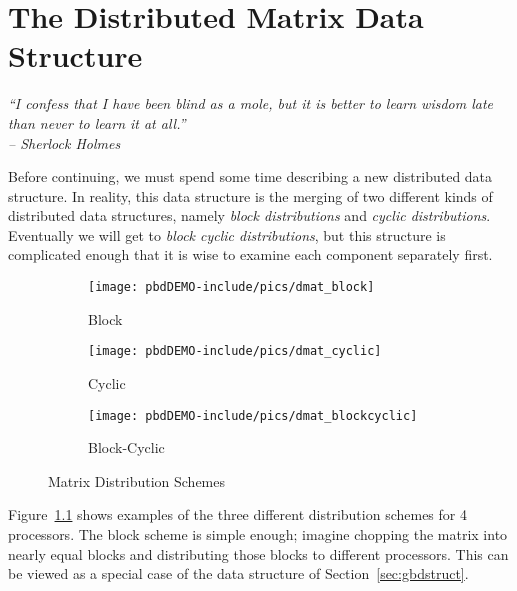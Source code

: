 \chapter{The Distributed Matrix Data Structure}
\label{chap:dmat}


{\it
``I confess that I have been blind as a mole,
but it is better to learn wisdom late than never to learn it at all.'' \\
\--- Sherlock Holmes
}
\vspace{0.5cm}


Before continuing, we must spend some time describing a new distributed data 
structure.  In reality, this data structure is the merging of two different 
kinds of distributed data structures, namely \emph{block distributions} and 
\emph{cyclic distributions}.  Eventually we will get to \emph{block cyclic 
distributions}, but this structure is complicated enough that it is wise to 
examine each component separately first.

\begin{figure}[ht]
        \centering
        \begin{subfigure}[b]{0.3\textwidth}
                \centering
                \texttt{[image: pbdDEMO-include/pics/dmat\_block]}
                \caption{Block}
        \end{subfigure}
        \hspace{.1cm}
        \begin{subfigure}[b]{0.3\textwidth}
                \centering
                \texttt{[image: pbdDEMO-include/pics/dmat\_cyclic]}
                \caption{Cyclic}
        \end{subfigure}
        \hspace{.01cm}
        \begin{subfigure}[b]{0.3\textwidth}
                \centering
                \texttt{[image: pbdDEMO-include/pics/dmat\_blockcyclic]}
                \caption{Block-Cyclic}
        \end{subfigure}
        \caption{Matrix Distribution Schemes}\label{fig:dmat1d}
\end{figure}


Figure~\ref{fig:dmat1d} shows examples of the three different distribution schemes for 4 processors.  The block scheme is simple enough; imagine chopping the matrix into nearly equal blocks and distributing those blocks to different processors.  This can be viewed as a special case of the  data structure of Section~\ref{sec:gbdstruct}.  

